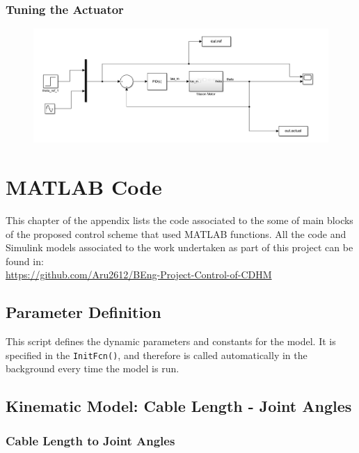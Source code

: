 \documentclass[a4paper,12pt]{report}
\begin{document}
\begin{appendices}
	\subsection{Tuning the Actuator}
	\begin{figure}[H]
		\includegraphics[width=\textwidth]{images/Motor-tuning.png}
	\end{figure}
	
	
	
	\chapter{MATLAB Code}
	\label{appendix:c}
	
	This chapter of the appendix lists the code associated to the some of main blocks of the proposed control scheme that used MATLAB functions. All the code and Simulink models associated to the work undertaken as part of this project can be found in: \\ \url{https://github.com/Aru2612/BEng-Project-Control-of-CDHM}
	
	\section{Parameter Definition}
	
	This script defines the dynamic parameters and constants for the model. It is specified in the \texttt{InitFcn()}, and therefore is called automatically in the background every time the model is run.
	
	
	\section{Kinematic Model: Cable Length - Joint Angles }
	\label{appendix:c-a}
	
	\subsection{Cable Length to Joint Angles}
	

\end{appendices}
\end{document}
